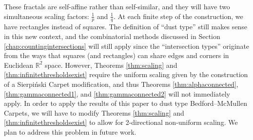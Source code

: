 \documentclass{article}
\theoremstyle{plain}
\numberwithin{equation}{section}
\numberwithin{table}{section}
\numberwithin{figure}{section}
\newcommand{\vaddspace}[1]{\rule{0pt}{#1pt}}
\newcommand{\newparagraph}{\vaddspace{10}}
\begin{document}
These fractals are self-affine rather than self-similar, and they will have two simultaneous scaling factors: $\frac{1}{p}$ and $\frac{1}{q}$. At each finite step of the construction, we have rectangles instead of squares. The definition of ``dust type'' still makes sense in this new context, and the combinatorial methods discussed in Section \ref{chap:countingintersections} will still apply since the ``intersection types'' originate from the ways that squares (and rectangles) can share edges and corners in Euclidean $\mathbb{R}^2$ space. However, Theorems \ref{thm:scaling} and \ref{thm:infinitethresholdsexist} require the uniform scaling given by the construction of a Sierpi\'nski Carpet modification, and thus Theorems \ref{thm:alphaconnected}, \ref{thm:gammaconnected1}, and \ref{thm:gammaconnected2} will not immediately apply. In order to apply the results of this paper to dust type Bedford--McMullen Carpets, we will have to modify Theorems \ref{thm:scaling} and \ref{thm:infinitethresholdsexist} to allow for 2-directional non-uniform scaling. We plan to address this problem in future work.
\newparagraph
\end{document}
